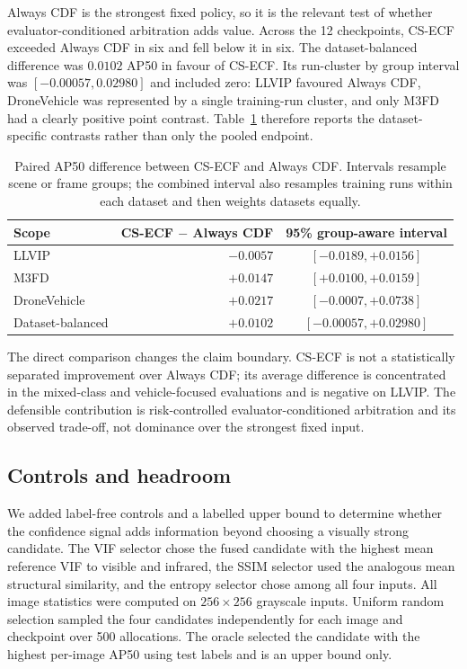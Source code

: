 \documentclass[preprint,11pt]{elsarticle}
\begin{document}
Always CDF is the strongest fixed policy, so it is the relevant test of whether
evaluator-conditioned arbitration adds value. Across the 12 checkpoints, CS-ECF
exceeded Always CDF in six and fell below it in six. The dataset-balanced
difference was \(0.0102\) AP50 in favour of CS-ECF. Its run-cluster by group
interval was \([-0.00057,0.02980]\) and included zero: LLVIP favoured Always
CDF, DroneVehicle was represented by a single training-run cluster, and only
M3FD had a clearly positive point contrast. Table~\ref{tab:cdf-paired} therefore
reports the dataset-specific contrasts rather than only the pooled endpoint.

\begin{table}[t]
\centering
\small
\caption{Paired AP50 difference between CS-ECF and Always CDF. Intervals
resample scene or frame groups; the combined interval also resamples training
runs within each dataset and then weights datasets equally.}
\label{tab:cdf-paired}
\begin{tabular}{@{}lrc@{}}
\toprule
Scope & CS-ECF \(-\) Always CDF & 95\% group-aware interval \\
\midrule
LLVIP & \(-0.0057\) & \([-0.0189,+0.0156]\) \\
M3FD & \(+0.0147\) & \([+0.0100,+0.0159]\) \\
DroneVehicle & \(+0.0217\) & \([-0.0007,+0.0738]\) \\
Dataset-balanced & \(+0.0102\) & \([-0.00057,+0.02980]\) \\
\bottomrule
\end{tabular}
\end{table}

The direct comparison changes the claim boundary. CS-ECF is not a statistically
separated improvement over Always CDF; its average difference is concentrated
in the mixed-class and vehicle-focused evaluations and is negative on LLVIP.
The defensible contribution is risk-controlled evaluator-conditioned
arbitration and its observed trade-off, not dominance over the strongest fixed
input.

\subsection{Controls and headroom}

We added label-free controls and a labelled upper bound to determine whether
the confidence signal adds information beyond choosing a visually strong
candidate. The VIF selector chose the fused candidate with the highest mean
reference VIF to visible and infrared, the SSIM selector used the analogous
mean structural similarity, and the entropy selector chose among all four
inputs. All image statistics were computed on \(256\times256\) grayscale
inputs. Uniform random selection sampled the four candidates independently
for each image and checkpoint over 500 allocations. The oracle selected the
candidate with the highest per-image AP50 using test labels and is an upper
bound only.
\end{document}
